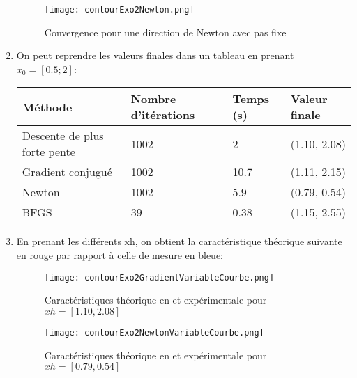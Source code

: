 \documentclass[12pt,a4paper,titlepage]{article}
\begin{document}
\begin{enumerate}
{             \begin{figure}[H]
                \centering
                \texttt{[image: contourExo2Newton.png]}
                \caption{Convergence pour une direction de Newton avec pas fixe}
            \end{figure}
    }
    
    \item{On peut reprendre les valeurs finales dans un tableau en prenant $x_0=[0.5; 2]$:

    	\begin{table}[H]
                \begin{tabularx}{\textwidth}{|l|X|X|X|}
                    \hline
                    Méthode & Nombre d'itérations & Temps (s) & Valeur finale \\
                    \hline
                    Descente de plus forte pente & 1002 & 2 & (1.10, 2.08) \\
                    \hline
                    Gradient conjugué & 1002  &  10.7 & (1.11, 2.15)\\
                    \hline
                    Newton &  1002 & 5.9 & (0.79, 0.54) \\
                    \hline
                    BFGS & 39 & 0.38 & (1.15, 2.55)\\
                    \hline
                \end{tabularx}
            \end{table}
    }
    
    \item{En prenant les différents xh, on obtient la caractéristique théorique  suivante en rouge par rapport à celle de mesure en bleue:
   	 \begin{figure}[H]
                \centering
                \texttt{[image: contourExo2GradientVariableCourbe.png]}
                \caption{Caractéristiques théorique en et expérimentale pour $xh = [1.10, 2.08]$ }
            \end{figure}
            
            \begin{figure}[H]
                \centering
                \texttt{[image: contourExo2NewtonVariableCourbe.png]}
                \caption{Caractéristiques théorique en et expérimentale pour $xh = [0.79, 0.54]$ }
            \end{figure}
        }
\end{enumerate}
\end{document}

